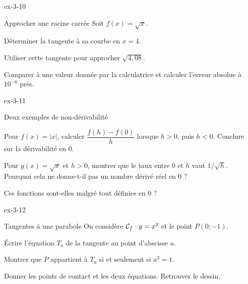 \begin{blocLivre}{ex-3-10}
\begin{exercice}[2]{Approcher une racine carrée}
Soit $f(x)=\sqrt x$.
\begin{questions}\item Déterminer la tangente à sa courbe en $x=4$.
\item Utiliser cette tangente pour approcher $\sqrt{4{,}08}$.
\item Comparer à une valeur donnée par la calculatrice et calculer l'erreur absolue à $10^{-6}$ près.
\end{questions}
\end{exercice}
\end{blocLivre}
\begin{blocLivre}{ex-3-11}
\begin{exercice}[2]{Deux exemples de non-dérivabilité}
\begin{questions}
\item Pour $f(x)=|x|$, calculer $\dfrac{f(h)-f(0)}h$ lorsque $h>0$, puis $h<0$.
Conclure sur la dérivabilité en 0.
\item Pour $g(x)=\sqrt x$ et $h>0$, montrer que le taux entre 0 et $h$ vaut $1/\sqrt h$.
Pourquoi cela ne donne-t-il pas un nombre dérivé réel en 0 ?
\item Ces fonctions sont-elles malgré tout définies en 0 ?
\end{questions}
\label{figlivre-r03-11-nonderivable-ex}

\end{exercice}
\end{blocLivre}
\clearpage
{}
\begin{blocLivre}{ex-3-12}
\begin{exercice}[3]{Tangentes à une parabole}
On considère $\mathcal{C}_f:y=x^2$ et le point $P(0;-1)$.
\begin{center}\end{center}
\begin{questions}
\item Écrire l'équation $T_a$ de la tangente au point d'abscisse $a$.
\item Montrer que $P$ appartient à $T_a$ si et seulement si $a^2=1$.
\item Donner les points de contact et les deux équations. Retrouver le dessin.
\end{questions}
\end{exercice}
\end{blocLivre}
